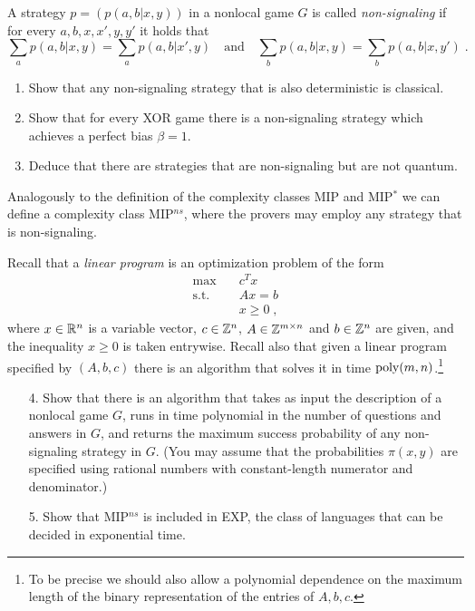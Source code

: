 \begin{exercise}
A strategy $p=(p(a,b|x,y))$ in a nonlocal game $G$ is called \emph{non-signaling} if  for every $a,b,x,x',y,y'$ it holds that 
\[ \sum_{a} p(a,b|x,y) = \sum_{a} p(a,b|x',y) \quad\text{and}\quad \sum_{b} p(a,b|x,y) = \sum_{b} p(a,b|x,y')\;.\]
\begin{enumerate}
\item Show that any non-signaling strategy that is also deterministic is classical.
\item Show that for every XOR game there is a non-signaling strategy which achieves a perfect bias $\beta=1$.  
\item Deduce that there are strategies that are non-signaling but are not quantum. 
\end{enumerate}
Analogously to the definition of the complexity classes MIP and MIP$^*$ we can define a complexity class MIP$^{ns}$, where the provers may employ any strategy that is non-signaling. 

Recall that a \emph{linear program} is an optimization problem of the form 
\begin{align*}
\max \quad & c^T x \\ 
\text{s.t.} \quad & Ax = b\\
& x\geq 0\;,
\end{align*}
where $x\in \mathbb{R}^n$ is a variable vector, $c\in\mathbb{Z}^n$, $A\in\mathbb{Z}^{m\times n}$ and $b\in \mathbb{Z}^n$ are given, and the inequality $x\geq 0$ is taken entrywise. Recall also that given a linear program specified by $(A,b,c)$ there is an algorithm that solves it in time $\operatorname{poly}(m,n)$.\footnote{To be precise we should also allow a polynomial dependence on the maximum length of the binary representation of the entries of $A,b,c$.} 
\begin{enumerate}
\item[4.] Show that there is an algorithm that takes as input the description of a nonlocal game $G$, runs in time polynomial in the number of questions and answers in $G$, and returns the maximum success probability of any non-signaling strategy in $G$. (You may assume that the probabilities $\pi(x,y)$ are specified using rational numbers with constant-length numerator and denominator.)
\item[5.] Show that MIP$^{ns}$ is included in EXP, the class of languages that can be decided in exponential time. 
\end{enumerate}

\end{exercise}

